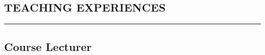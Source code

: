 \documentclass{article}
\begin{document}




\pagebreak


\vspace{-9pt}

\subsection*{TEACHING EXPERIENCES}
\vspace{-2pt}
\hrule
\vspace{10pt}


\subsection*{Course Lecturer}
\end{document}
